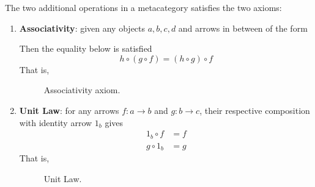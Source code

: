 \begin{definition}[Metacategory]
    The two additional operations in a metacategory satisfies the two axioms:
    \begin{enumerate}
        \item \textbf{Associativity}: given any objects $a, b, c, d$ and arrows in between of the form
        \begin{figure}[H]
            \centering
        \end{figure}
        Then the equality below is satisfied
        \begin{equation}
            h \circ (g \circ f) = (h \circ g) \circ f
        \end{equation}
        That is,
        \begin{figure}[H]
            \centering
            \caption{Associativity axiom.}
            \label{fig:associativity-axiom}
        \end{figure}
        \item \textbf{Unit Law}: for any arrows $f \colon a \to b$ and $g \colon b \to c$, their respective composition with identity arrow $1_b$ gives
        \begin{align}
            1_b \circ f &= f \\
            g \circ 1_b &= g
        \end{align}
        That is,
        \begin{figure}[H]
            \centering
            \caption{Unit Law.}
            \label{fig:unit-law}
        \end{figure}
    \end{enumerate}
\end{definition}

